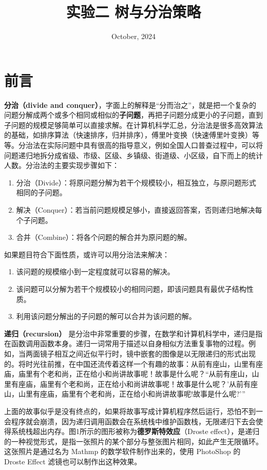 \documentclass[12pt,a4paper]{article}
\title{实验二 \hspace{0.5cm} 树与分治策略}
\author{}
\date{October, 2024}
\begin{document}
\maketitle

\section{前言}

\textbf{分治（divide and conquer）}，字面上的解释是“分而治之”，就是把一个复杂的问题分解成两个或多个相同或相似的\textbf{子问题}，再把子问题分成更小的子问题，直到子问题的规模足够简单可以直接求解。在计算机科学汇总，分治法是很多高效算法的基础，如排序算法（快速排序，归并排序），傅里叶变换（快速傅里叶变换）等等。分治法在实际问题中具有很高的指导意义，例如全国人口普查过程中，可以将问题递归地拆分成省级、市级、区级、乡镇级、街道级、小区级，自下而上的统计人数。分治法的主要实现步骤如下：
\begin{enumerate}[noitemsep]
    \item 分治（Divide）：将原问题分解为若干个规模较小，相互独立，与原问题形式相同的子问题。
    \item 解决（Conquer）：若当前问题规模足够小，直接返回答案，否则递归地解决每个子问题。
    \item 合并（Combine）：将各个问题的解合并为原问题的解。
\end{enumerate}

如果题目符合下面性质，或许可以用分治法来解决：
\begin{enumerate}[noitemsep]
    \item 该问题的规模缩小到一定程度就可以容易的解决。
    \item 该问题可以分解为若干个规模较小的相同问题，即该问题具有最优子结构性质。
    \item 利用该问题分解出的子问题的解可以合并为该问题的解。
\end{enumerate}

\textbf{递归（recursion）} 是分治中非常重要的步骤，在数学和计算机科学中，递归是指在函数调用函数本身。递归一词常用于描述以自身相似方法重复事物的过程。例如，当两面镜子相互之间近似平行时，镜中嵌套的图像是以无限递归的形式出现的。将时光往前推，在中国还流传着这样一个有趣的故事：从前有座山，山里有座庙，庙里有个老和尚，正在给小和尚讲故事呢！故事是什么呢？“从前有座山，山里有座庙，庙里有个老和尚，正在给小和尚讲故事呢！故事是什么呢？'从前有座山，山里有座庙，庙里有个老和尚，正在给小和尚讲故事呢!故事是什么呢?'”

上面的故事似乎是没有终点的，如果将故事写成计算机程序然后运行，恐怕不到一会程序就会崩溃，因为递归调用函数会在系统栈中维护函数栈，无限递归下去会使得系统栈超出内存。图1所示的图形被称为\textbf{德罗斯特效应}（Droste effect），是递归的一种视觉形式，是指一张照片的某个部分与整张图片相同，如此产生无限循环。这张照片是通过名为 Mathmp 的数学软件制作出来的，使用 PhotoShop 的 Droste Effect 滤镜也可以制作出这种效果。
\end{document}

